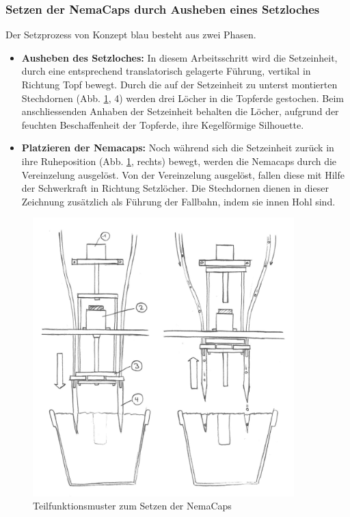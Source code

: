 \subsubsection{Setzen der NemaCaps durch Ausheben eines Setzloches}
Der Setzprozess von Konzept blau besteht aus zwei Phasen.

\begin{itemize}
	\item \textbf{Ausheben des Setzloches:} In diesem Arbeitsschritt wird die Setzeinheit, durch eine entsprechend translatorisch gelagerte Führung, vertikal in Richtung Topf bewegt. Durch die auf der Setzeinheit zu unterst montierten Stechdornen (Abb. \ref{fig:blau_setzeinheit}, 4) werden drei Löcher in die Topferde gestochen. Beim anschliessenden Anhaben der Setzeinheit behalten die Löcher, aufgrund der feuchten Beschaffenheit der Topferde, ihre Kegelförmige Silhouette.
	
	\item \textbf{Platzieren der Nemacaps:} Noch während sich die Setzeinheit zurück in ihre Ruheposition (Abb. \ref{fig:blau_setzeinheit}, rechts) bewegt, werden die Nemacaps durch die Vereinzelung ausgelöst. Von der Vereinzelung ausgelöst, fallen diese mit Hilfe der Schwerkraft in Richtung Setzlöcher. Die Stechdornen dienen in dieser Zeichnung zusätzlich als Führung der Fallbahn, indem sie innen Hohl sind.
\end{itemize}

\begin{figure}[H]
	\includegraphics[width=0.9\textwidth]{Illustrationen/5-Konzept/blau_Setzeinheit_ohneLegende.jpg}
	\caption{Teilfunktionsmuster zum Setzen der NemaCaps}
	\label{fig:blau_setzeinheit}
\end{figure}

